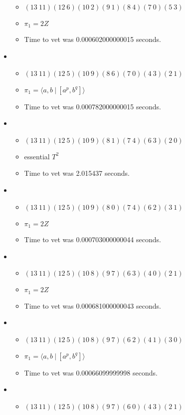 \documentclass{article}
\begin{document}
\begin{itemize}
\begin{itemize}
      \item $(13\ 11)(12\ 6)(10\ 2)(9\ 1)(8\ 4)(7\ 0)(5\ 3)$
      \item $\pi_1 =2 Z$
      \item Time to vet was 0.000602000000015 seconds.
\end{itemize}
\item \begin{itemize}
      \item $(13\ 11)(12\ 5)(10\ 9)(8\ 6)(7\ 0)(4\ 3)(2\ 1)$
      \item $\pi_1 = \langle a,b\ |\ [a^p,b^q]\rangle$
      \item Time to vet was 0.000782000000015 seconds.
\end{itemize}
\item \begin{itemize}
      \item $(13\ 11)(12\ 5)(10\ 9)(8\ 1)(7\ 4)(6\ 3)(2\ 0)$
      \item essential $T^2$
      \item Time to vet was 2.015437 seconds.
\end{itemize}
\item \begin{itemize}
      \item $(13\ 11)(12\ 5)(10\ 9)(8\ 0)(7\ 4)(6\ 2)(3\ 1)$
      \item $\pi_1 =2 Z$
      \item Time to vet was 0.000703000000044 seconds.
\end{itemize}
\item \begin{itemize}
      \item $(13\ 11)(12\ 5)(10\ 8)(9\ 7)(6\ 3)(4\ 0)(2\ 1)$
      \item $\pi_1 =2 Z$
      \item Time to vet was 0.000681000000043 seconds.
\end{itemize}
\item \begin{itemize}
      \item $(13\ 11)(12\ 5)(10\ 8)(9\ 7)(6\ 2)(4\ 1)(3\ 0)$
      \item $\pi_1 = \langle a,b\ |\ [a^p,b^q]\rangle$
      \item Time to vet was 0.00066099999998 seconds.
\end{itemize}
\item \begin{itemize}
      \item $(13\ 11)(12\ 5)(10\ 8)(9\ 7)(6\ 0)(4\ 3)(2\ 1)$

\end{itemize}
\end{itemize}
\end{document}
